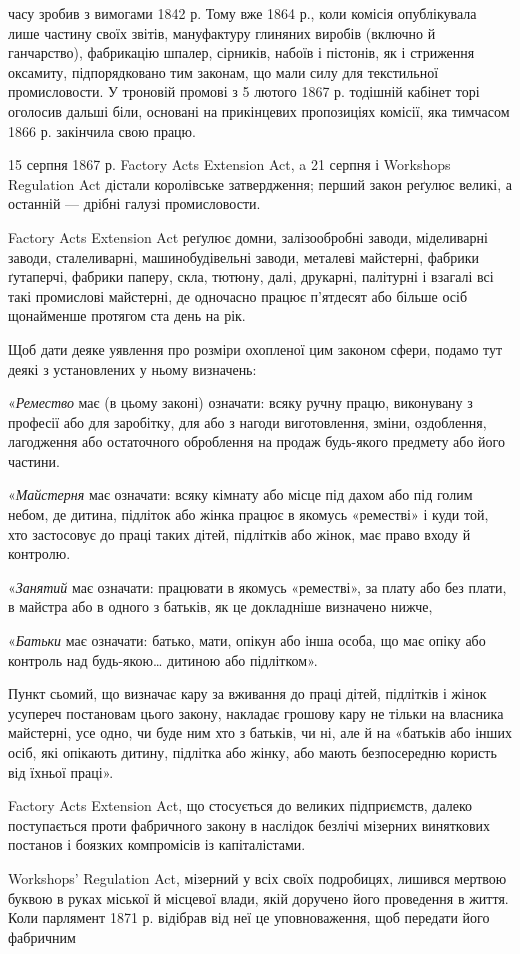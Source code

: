 \parcont{}  %
часу зробив з вимогами 1842 р. Тому вже 1864 р., коли комісія
опублікувала лише частину своїх звітів, мануфактуру глиняних
виробів (включно й ганчарство), фабрикацію шпалер, сірників,
набоїв і пістонів, як і стриження оксамиту, підпорядковано
тим законам, що мали силу для текстильної промисловости.
У троновій промові з 5 лютого 1867 р. тодішній кабінет торі
оголосив дальші біли, основані на прикінцевих пропозиціях
комісії, яка тимчасом 1866 р. закінчила свою працю.

15 серпня 1867 р. Factory Acts Extension Act, a 21 серпня і
Workshops Regulation Act дістали королівське затвердження;
перший закон реґулює великі, а останній — дрібні галузі промисловости.

Factory Acts Extension Act реґулює домни, залізообробні
заводи, міделиварні заводи, сталеливарні, машинобудівельні заводи,
металеві майстерні, фабрики ґутаперчі, фабрики паперу,
скла, тютюну, далі, друкарні, палітурні і взагалі всі такі промислові
майстерні, де одночасно працює п’ятдесят або більше осіб
щонайменше протягом ста день на рік.

Щоб дати деяке уявлення про розміри охопленої цим законом
сфери, подамо тут деякі з установлених у ньому визначень:

«\emph{Ремество} має (в цьому законі) означати: всяку ручну
працю, виконувану з професії або для заробітку, для або з
нагоди виготовлення, зміни, оздоблення, лагодження або остаточного
оброблення на продаж будь-якого предмету або його
частини.

«\emph{Майстерня} має означати: всяку кімнату або місце під дахом
або під голим небом, де дитина, підліток або жінка працює в
якомусь «реместві» і куди той, хто застосовує до праці таких
дітей, підлітків або жінок, має право входу й контролю.

«\emph{Занятий} має означати: працювати в якомусь «реместві»,
за плату або без плати, в майстра або в одного з батьків, як це
докладніше визначено нижче,

«\emph{Батьки} має означати: батько, мати, опікун або інша особа,
що має опіку або контроль над будь-якою\dots{} дитиною або підлітком».

Пункт сьомий, що визначає кару за вживання до праці дітей,
підлітків і жінок усупереч постановам цього закону, накладає
грошову кару не тільки на власника майстерні, усе одно, чи буде
ним хто з батьків, чи ні, але й на «батьків або інших осіб, які
опікають дитину, підлітка або жінку, або мають безпосередню
користь від їхньої праці».

Factory Acts Extension Act, що стосується до великих підприємств,
далеко поступається проти фабричного закону в наслідок
безлічі мізерних виняткових постанов і боязких компромісів
із капіталістами.

Workshops’ Regulation Act, мізерний у всіх своїх подробицях,
лишився мертвою буквою в руках міської й місцевої влади, якій
доручено його проведення в життя. Коли парлямент 1871 р.
відібрав від неї це уповноваження, щоб передати його фабричним
\parbreak{}  %
